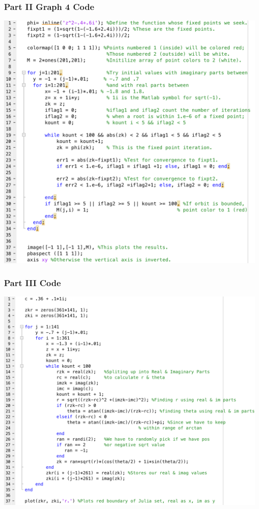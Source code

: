 \documentclass[11pt]{article}
\theoremstyle{plain}
\theoremstyle{definition}
\begin{document}
\subsubsection*{Part II Graph 4 Code}
\includegraphics*[scale = 0.35]{Part2dCode.png}
\subsubsection*{Part III Code}
\includegraphics*[scale = 0.35]{Part3Code.png}
\end{document}
